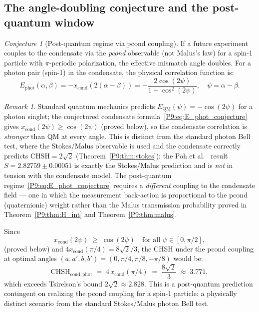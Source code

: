 \documentclass[11pt,a4paper]{article}
\theoremstyle{definition}
\theoremstyle{remark}
\newtheorem{remark}[theorem]{Remark}
\newtheorem{conjecture}[theorem]{Conjecture}
\newcommand{\xcond}{x_{\mathrm{cond}}}
\newcommand{\CHSH}{\mathrm{CHSH}}
\newcommand{\Tsirelson}{2\sqrt{2}}
\begin{document}
\subsection{The angle-doubling conjecture and the post-quantum window}
 
\begin{conjecture}[Post-quantum regime via pcond coupling]
\label{P9:conj:angle_doubling}
If a future experiment couples to the condensate via the \emph{pcond}
observable (not Malus's law) for a spin-1 particle with $\pi$-periodic
polarization, the effective mismatch angle doubles. For a photon pair (spin-1) in the condensate, the physical correlation function is:
\begin{equation}
  E_\mathrm{phot}(\alpha,\beta)
  = -\xcond(2(\alpha-\beta))
  = -\frac{2\cos(2\psi)}{1+\cos^2(2\psi)},
  \quad \psi = \alpha-\beta.
  \label{P9:eq:E_phot_conjecture}
\end{equation}

\begin{remark}
\label{P9:rem:poh}
Standard quantum mechanics predicts $E_\mathrm{QM}(\psi) = -\cos(2\psi)$
for a photon singlet; the conjectured condensate
formula~\eqref{P9:eq:E_phot_conjecture}
gives $\xcond(2\psi)\geq\cos(2\psi)$ (proved below), so the condensate
correlation is \emph{stronger} than QM at every angle.
This is distinct from the standard photon Bell test, where the Stokes/Malus
observable is used and the condensate correctly predicts $\CHSH=\Tsirelson$
(Theorem~\ref{P9:thm:stokes}): the Poh et al.~\cite{Poh2015} result
$S=2.82759\pm0.00051$ is exactly the Stokes/Malus prediction and is
\emph{not} in tension with the condensate model.
The post-quantum regime~\eqref{P9:eq:E_phot_conjecture} requires a
\emph{different} coupling to the condensate field --- one in which the
measurement back-action is proportional to the pcond (quaternionic)
weight rather than the Malus transmission probability proved in
Theorem~\ref{P9:thm:H_int} and Theorem~\ref{P9:thm:malus}.
\end{remark}

Since
\begin{equation}
  \xcond(2\psi) \;\geq\; \cos(2\psi)
  \quad\text{for all }\psi\in[0,\pi/2],
  \label{P9:eq:xcond_geq_cos}
\end{equation}
(proved below) and $4\xcond(\pi/4)=8\sqrt{2}/3$,
the CHSH under the pcond coupling at optimal angles
$(a,a',b,b')=(0,\pi/4,\pi/8,-\pi/8)$ would be:
\begin{equation}
  \boxed{\CHSH_\mathrm{cond,phot}
  \;=\; 4\,\xcond(\pi/4)
  \;=\; \frac{8\sqrt{2}}{3}
  \;\approx\; 3.771},
  \label{P9:eq:CHSH_postquantum}
\end{equation}
which exceeds Tsirelson's bound $2\sqrt{2}\approx2.828$.
This is a post-quantum prediction contingent on realizing the pcond coupling
for a spin-1 particle: a physically distinct scenario from the standard
Stokes/Malus photon Bell test.
\end{conjecture}
\end{document}
